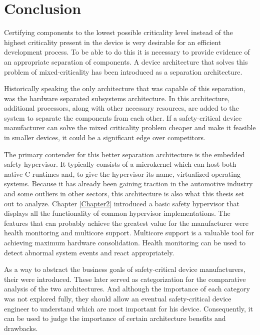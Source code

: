 
\section{Conclusion}
Certifying components to the lowest possible criticality level instead of the highest criticality present in the device is very desirable for an efficient development process. To be able to do this it is necessary to provide evidence of an appropriate separation of components. A device architecture that solves this problem of mixed-criticality has been introduced as a separation architecture.

Historically speaking the only architecture that was capable of this separation, was the hardware separated subsystems architecture. In this architecture, additional processors, along with other necessary resources, are added to the system to separate the components from each other. If a safety-critical device manufacturer can solve the mixed criticality problem cheaper and make it feasible in smaller devices, it could be a significant edge over competitors.

The primary contender for this better separation architecture is the embedded safety hypervisor. It typically consists of a microkernel which can host both native C runtimes and, to give the hypervisor its name, virtualized operating systems. Because it has already been gaining traction in the automotive industry and some outliers in other sectors, this architecture is also what this thesis set out to analyze. Chapter \ref{Chapter2} introduced a basic safety hypervisor that displays all the functionality of common hypervisor implementations. The features that can probably achieve the greatest value for the manufacturer were health monitoring and multicore support. Multicore support is a valuable tool for achieving maximum hardware consolidation. Health monitoring can be used to detect abnormal system events and react appropriately. 

As a way to abstract the business goals of safety-critical device manufacturers, their  were introduced. These later served as categorization for the comparative analysis of the two architectures. And although the importance of each category was not explored fully, they should allow an eventual safety-critical device engineer to understand which are most important for his device. Consequently, it can be used to judge the importance of certain architecture benefits and drawbacks.

